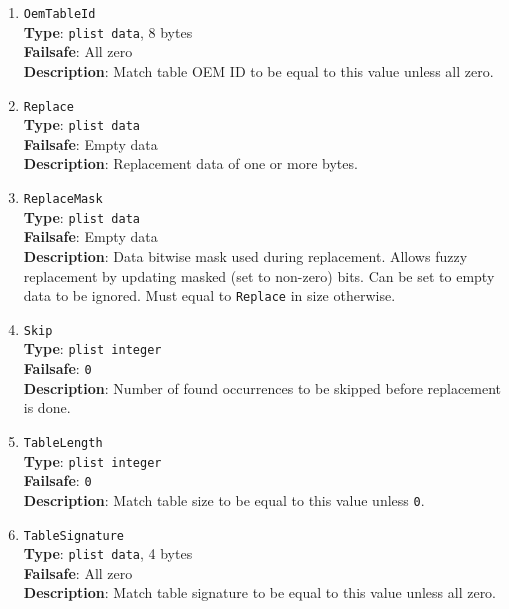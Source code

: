 \documentclass[]{article}
\begin{document}
\begin{enumerate}
\item
  \texttt{OemTableId}\\
  \textbf{Type}: \texttt{plist\ data}, 8 bytes\\
  \textbf{Failsafe}: All zero\\
  \textbf{Description}: Match table OEM ID to be equal to this value
  unless all zero.

\item
  \texttt{Replace}\\
  \textbf{Type}: \texttt{plist\ data}\\
  \textbf{Failsafe}: Empty data\\
  \textbf{Description}: Replacement data of one or more bytes.

\item
  \texttt{ReplaceMask}\\
  \textbf{Type}: \texttt{plist\ data}\\
  \textbf{Failsafe}: Empty data\\
  \textbf{Description}: Data bitwise mask used during replacement.
  Allows fuzzy replacement by updating masked (set to non-zero) bits. Can be
  set to empty data to be ignored. Must equal to \texttt{Replace} in size
  otherwise.

\item
  \texttt{Skip}\\
  \textbf{Type}: \texttt{plist\ integer}\\
  \textbf{Failsafe}: \texttt{0}\\
  \textbf{Description}: Number of found occurrences to be skipped before replacement
  is done.

\item
  \texttt{TableLength}\\
  \textbf{Type}: \texttt{plist\ integer}\\
  \textbf{Failsafe}: \texttt{0}\\
  \textbf{Description}: Match table size to be equal to this value
  unless \texttt{0}.

\item
  \texttt{TableSignature}\\
  \textbf{Type}: \texttt{plist\ data}, 4 bytes\\
  \textbf{Failsafe}: All zero\\
  \textbf{Description}: Match table signature to be equal to this value
  unless all zero.

\end{enumerate}
\end{document}
